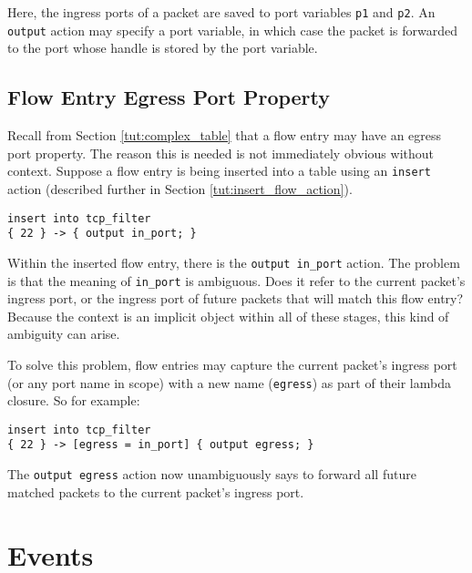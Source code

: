 Here, the ingress ports of a packet are saved to port variables \texttt{p1} and \texttt{p2}. An \texttt{output} action may specify a port variable, in which case the packet is forwarded to the port whose handle is stored by the port variable.

\subsection{Flow Entry Egress Port Property}

Recall from Section \ref{tut:complex_table} that a flow entry may
have an egress port property.
The reason this is needed is not immediately obvious without context.
Suppose a flow entry is being inserted into a table using an
\texttt{insert} action (described further in Section \ref{tut:insert_flow_action}).

\begin{codepage}
\begin{lstlisting}
insert into tcp_filter
{ 22 } -> { output in_port; }
\end{lstlisting}
\end{codepage}

Within the inserted flow entry, there is the \texttt{output in\_port} action.
The problem is that the meaning of \texttt{in\_port} is ambiguous. 
Does it refer to the current packet's ingress port, or the ingress port of
future packets that will match this flow entry? Because the context is
an implicit object within all of these stages, this kind of ambiguity can
arise.

To solve this problem, flow entries may capture the current packet's ingress
port (or any port name in scope) with a new name (\texttt{egress}) as part of 
their lambda closure. So for example:

\begin{codepage}
\begin{lstlisting}
insert into tcp_filter
{ 22 } -> [egress = in_port] { output egress; }
\end{lstlisting}
\end{codepage}

The \texttt{output egress} action now unambiguously says to forward all future
matched packets to the current packet's ingress port.

\section{Events} \label{tut:event}

